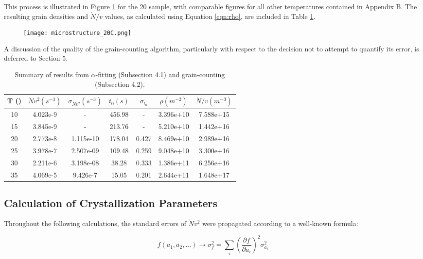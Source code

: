 This process is illustrated in Figure \ref{fig:algo_ex} for the 20  sample, with comparable figures for all other temperatures contained in Appendix B.  The resulting grain densities and $\dot{N}/v$ values, as calculated using Equation \ref{eqn:rho}, are included in Table \ref{table:data_results}.

	\begin{figure}[h]
		\centering
		\texttt{[image: microstructure\_20C.png]}
		\caption{}
		\label{fig:algo_ex}
	\end{figure}

A discussion of the quality of the grain-counting algorithm, particularly with respect to the decision not to attempt to quantify its error, is deferred to Section 5.

	\begin{table}[h!]
	\centering
	\begin{tabular}{|c c c c c c c|} 
	\hline
		T (\textdegree{C}) & $\dot{N}v^2 (s^{-3})$ & $\sigma_{\dot{N}v^2}(s^{-3})$ & $t_0 (s)$ & $\sigma_{t_0}$ & $\rho (m^{-2})$ & $\dot{N}/v (m^{-3})$ \\ 
	\hline
		10 & 4.023e-9 & - & 456.98 & - & 3.396e+10 & 7.588e+15\\ 
		15 & 3.845e-9 & - & 213.76 & - & 5.210e+10 & 1.442e+16\\
		20 & 2.773e-8 & 1.115e-10 & 178.04 & 0.427 & 8.469e+10 & 2.989e+16\\
		25 & 3.978e-7 & 2.507e-09 & 109.48 & 0.259 & 9.048e+10 & 3.300e+16\\
		30 & 2.211e-6 & 3.198e-08 & 38.28 & 0.333 & 1.386e+11 & 6.256e+16\\
		35 & 4.069e-5 & 9.426e-7 & 15.05 & 0.201 & 2.644e+11 & 1.648e+17\\
	\hline
	\end{tabular}
		\caption{Summary of results from $\alpha$-fitting (Subsection 4.1) and grain-counting (Subsection 4.2).}
	\label{table:data_results}
	\end{table}

\subsection{Calculation of Crystallization Parameters}

Throughout the following calculations, the standard errors of $\dot{N}v^2$ were propagated according to a well-known formula:

	\begin{equation}
		f(a_1, a_2, ...) \rightarrow \sigma^2_f = \sum_i \left( \frac{\partial f}{\partial a_i} \right)^2 \sigma^2_{a_i}
		\label{eqn:se}
	\end{equation}

